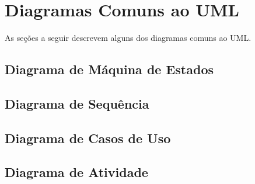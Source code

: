 \section{Diagramas Comuns ao UML}
As seções a seguir descrevem alguns dos diagramas comuns ao UML.

\subsection{Diagrama de Máquina de Estados}


\subsection{Diagrama de Sequência}


\subsection{Diagrama de Casos de Uso}


\subsection{Diagrama de Atividade}
